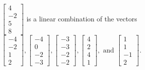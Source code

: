 \begin{exercise}
\begin{exerciseStatement}
  \end{exerciseStatement}
  \begin{exerciseAnswer}
   \(\left[\begin{array}{c}
4 \\
-2 \\
5 \\
8
\end{array}\right]\) 
  	 is  
	a linear combination of the vectors \(\left[\begin{array}{c}
-4 \\
-2 \\
1 \\
2
\end{array}\right] , \left[\begin{array}{c}
-4 \\
0 \\
-2 \\
-3
\end{array}\right] , \left[\begin{array}{c}
-3 \\
-3 \\
-2 \\
-2
\end{array}\right] , \left[\begin{array}{c}
4 \\
2 \\
4 \\
1
\end{array}\right] , \text{ and } \left[\begin{array}{c}
1 \\
1 \\
-1 \\
2
\end{array}\right]\).

	
  


  \end{exerciseAnswer}
\end{exercise}